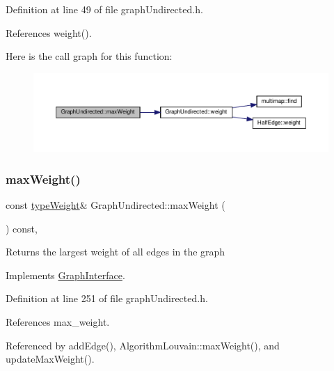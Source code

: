 Definition at line 49 of file graph\+Undirected.\+h.



References weight().

Here is the call graph for this function\+:
\nopagebreak
\begin{figure}[H]
\begin{center}
\leavevmode
\includegraphics[width=350pt]{classGraphUndirected_a99cc719c89bd4afb612cdae920939a00_cgraph}
\end{center}
\end{figure}
\mbox{\label{classGraphUndirected_a7c21f40748eef95d1c35be892ab10ce2}} 
\subsubsection{\texorpdfstring{max\+Weight()}{maxWeight()}\hspace{0.1cm}{\footnotesize\ttfamily [2/2]}}
{\footnotesize\ttfamily const \hyperlink{edge_8h_a2e7ea3be891ac8b52f749ec73fee6dd2}{type\+Weight}\& Graph\+Undirected\+::max\+Weight (\begin{DoxyParamCaption}{ }\end{DoxyParamCaption}) const\hspace{0.3cm}{\ttfamily [inline]}, {\ttfamily [virtual]}}

\begin{DoxyReturn}{Returns}
the largest weight of all edges in the graph 
\end{DoxyReturn}


Implements \hyperlink{classGraphInterface_a2fb0681f6cda5f8318adf7ee95df3685}{Graph\+Interface}.



Definition at line 251 of file graph\+Undirected.\+h.



References max\+\_\+weight.



Referenced by add\+Edge(), Algorithm\+Louvain\+::max\+Weight(), and update\+Max\+Weight().

